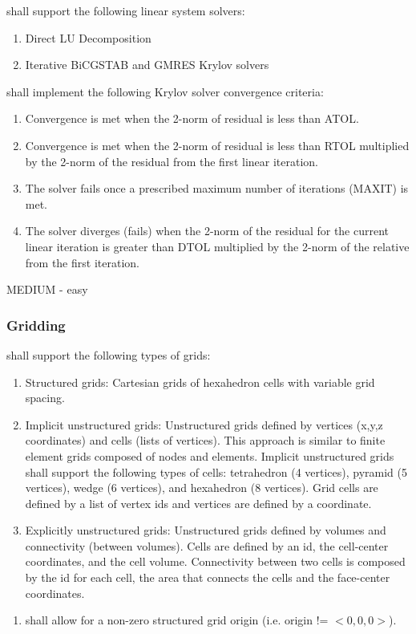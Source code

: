 \vspace{0.25cm}
\noindent\pft shall support the following linear system solvers:
\begin{enumerate}[resume]
	\item \label{linearDirect} Direct LU Decomposition
	\item \label{linearIterative} Iterative BiCGSTAB and GMRES Krylov solvers
\end{enumerate}
\vspace{0.25cm}
\pft shall implement the following Krylov solver convergence criteria:
\begin{enumerate}[resume]
	\item \label{linearATOL} Convergence is met when the 2-norm of residual is less than ATOL.
	\item \label{linearRTOL} Convergence is met when the 2-norm of residual is less than RTOL multiplied by the 2-norm of the residual from the first linear iteration.
	\item \label{linearMaxIt} The solver fails once a prescribed maximum number of iterations (MAXIT) is met.
	\item \label{linearDTOL} The solver diverges (fails) when the 2-norm of the residual for the current linear iteration is greater than DTOL multiplied by the 2-norm of the relative from the first iteration.
\end{enumerate}
MEDIUM - easy

\subsubsection{Gridding}
\pft shall support the following types of grids:
\begin{enumerate}[resume]
	\item Structured grids:  \label{structGrid} Cartesian grids of hexahedron cells with variable grid spacing.
	\item Implicit unstructured grids: \label{impStructGrid} Unstructured grids defined by vertices (x,y,z coordinates) and cells (lists of vertices). 
	This approach is similar to finite element grids composed of nodes and elements. Implicit unstructured grids shall support the following types of cells: tetrahedron (4 vertices), pyramid (5 vertices), wedge (6 vertices), and hexahedron (8 vertices). 
	Grid cells are defined by a list of vertex ids and vertices are defined by a coordinate.
	\item Explicitly unstructured grids: \label{expStructGrid} Unstructured grids defined by volumes and connectivity (between volumes). 
	Cells are defined by an id, the cell-center coordinates, and the cell volume.
	Connectivity between two cells is composed by the id for each cell, the area that connects the cells and the face-center coordinates.
\end{enumerate}
\vspace{0.25cm}
\begin{enumerate}[resume]
	\item \pft shall allow for a non-zero structured grid origin (i.e. origin != $<0,0,0>$).
\end{enumerate}

